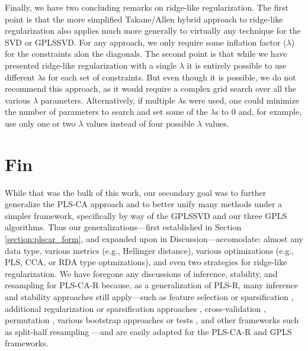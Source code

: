 \documentclass[12pt]{article}
\begin{document}
Finally, we have two concluding remarks on ridge-like regularization.
The first point is that the more simplified Takane/Allen hybrid approach
to ridge-like regularization also applies much more generally to
virtually any technique for the SVD or GPLSSVD. For any approach, we
only require some inflation factor (\(\lambda\)) for the constraints
alon the diagonals. The second point is that while we have presented
ridge-like regularization with a single \(\lambda\) it is entirely
possible to use different \(\lambda\)s for each set of constraints. But
even though it is possible, we do not recommend this approach, as it
would require a complex grid search over all the various \(\lambda\)
parameters. Alternatively, if multiple \(\lambda\)s were used, one could
minimize the number of parameters to search and set some of the
\(\lambda\)s to 0 and, for example, use only one or two \(\lambda\)
values instead of four possible \(\lambda\) values.

\hypertarget{fin}{%
\section{Fin}\label{fin}}

While that was the bulk of this work, our secondary goal was to further
generalize the PLS-CA approach and to better unify many methods under a
simpler framework, specifically by way of the GPLSSVD and our three GPLS
algorithms. Thus our generalizations---first established in Section
\ref{section:plscar_form}, and expanded upon in Discussion---accomodate:
almost any data type, various metrics (e.g., Hellinger distance),
various optimizations (e.g., PLS, CCA, or RDA type optmizations), and
even two strategies for ridge-like regularization. We have foregone any
discussions of inference, stability, and resampling for PLS-CA-R
because, as a generalization of PLS-R, many inference and stability
approaches still apply---such as feature selection or sparsification
\citep{sutton_sparse_2018}, additional regularization or sparsification
approaches
\citep{le_floch_significant_2012-1, guillemot2019constrained, tenenhaus_variable_2014, tenenhaus_regularized_2011},
cross-validation
\citep{wold_principal_1987, rodriguez-perez_overoptimism_2018, kvalheim_number_2019, abdi_partial_2010-1},
permutation \citep{berry_permutation_2011}, various bootstrap
\citep{efron_bootstrap_1979, chernick_bootstrap_2008} approaches
\citep{abdi_partial_2010-1, takane_regularized_2009-1} or tests
\citep{mcintosh_partial_2004, krishnan_partial_2011}, and other
frameworks such as split-half resampling
\citep{strother_quantitative_2002-1, kovacevic2013revisiting, strother2004optimizing}---and
are easily adapted for the PLS-CA-R and GPLS frameworks.



\end{document}
